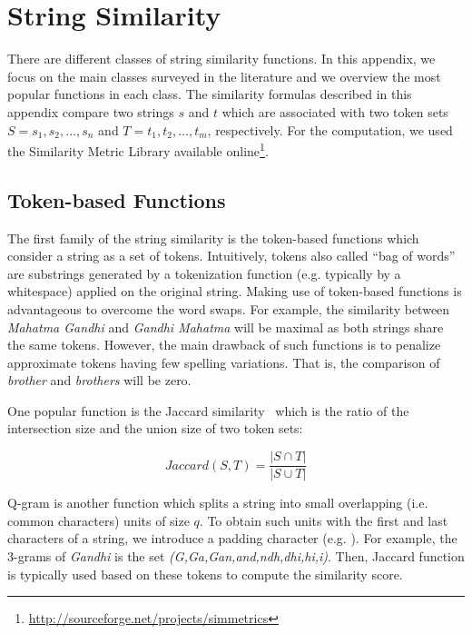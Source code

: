 \chapter{String Similarity} \label{app:similarity}
There are different classes of string similarity functions. In this appendix, we focus on the main classes surveyed in the literature and we overview the most popular functions in each class. The similarity formulas described in this appendix compare two strings $s$ and $t$ which are associated with two token sets $S=s_1,s_2,...,s_n$ and $T=t_1,t_2,...,t_m$, respectively. For the computation, we used the Similarity Metric Library available online\footnote{\url{http://sourceforge.net/projects/simmetrics}}.

\section{Token-based Functions} 

The first family of the string similarity is the token-based functions which consider a string as a set of tokens. Intuitively, tokens also called ``bag of words'' are substrings generated by a tokenization function  (e.g. typically by a whitespace) applied on the original string. Making use of token-based functions is advantageous to overcome the word swaps. For example, the similarity between \emph{Mahatma Gandhi} and \emph{Gandhi Mahatma} will be maximal as both strings share the same tokens. However, the main drawback of such functions is to penalize approximate tokens having few spelling variations. That is, the comparison of \emph{brother} and \emph{brothers} will be zero.

One popular function is the Jaccard similarity~\cite{Jaccard:BVSN1901} which is the ratio of the intersection size and the union size of two token sets:

\begin{equation*}
 Jaccard(S,T)=\frac{|S \cap T|}{|S \cup T|}
\end{equation*}

Q-gram is another function which splits a string into small overlapping (i.e. common characters) units of size $q$. To obtain such units with the first and last characters of a string, we introduce a padding character (e.g. \Hash). For example, the 3-grams of \emph{Gandhi} is the set \textit{(\Hash \Hash G,\Hash Ga,Gan,and,ndh,dhi,hi\Hash ,i\Hash \Hash)}. Then, Jaccard function is typically used based on these tokens to compute the similarity score. 

